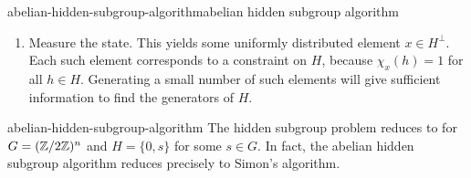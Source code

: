 \begin{topic}{abelian-hidden-subgroup-algorithm}{abelian hidden subgroup algorithm}
\begin{enumerate}[label=(\arabic*)]
\[\begin{aligned}
                = \frac{1}{\sqrt{|H| |G|}} \sum_{x \in G} \chi_g(x) \sum_{h \in H} \chi_h(x) \ket{x}
                = \sqrt{\frac{|H|}{|G|}} \sum_{\substack{x \in H^\perp}} \chi_g(x) \ket{x} ,
        \end{aligned} \]
        where $H^\perp = \{ x \in G \mid \chi_x(h) = 1 \textup{ for all } h \in H \}$, and where the last equality can be shown using the \href{/math-definitions/#RT:first-orthogonality-theorem}{first orthogonality theorem}.
        \item Measure the state. This yields some uniformly distributed element $x \in H^\perp$. Each such element corresponds to a constraint on $H$, because $\chi_x(h) = 1$ for all $h \in H$. Generating a small number of such elements will give sufficient information to find the generators of $H$.
    \end{enumerate}
\end{topic}

\begin{example}{abelian-hidden-subgroup-algorithm}
    The hidden subgroup problem reduces to  for $G = (\mathbb{Z} / 2\mathbb{Z})^{n}$ and $H = \{ 0, s \}$ for some $s \in G$. In fact, the abelian hidden subgroup algorithm reduces precisely to Simon's algorithm.
\end{example}
